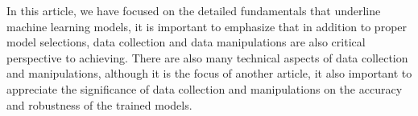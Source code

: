 
\par
In this article, we have focused on the detailed fundamentals that underline machine learning models, it is important to emphasize that in addition to proper model selections, data collection and data manipulations are also critical perspective to achieving. There are also many technical aspects of data collection and manipulations, although it is the focus of another article, it also important to appreciate the significance of data collection and manipulations on the accuracy and robustness of the trained models.
\par 
